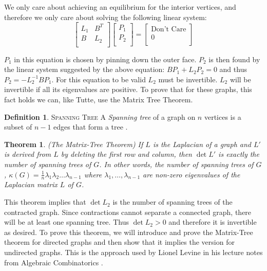 \documentclass[11pt]{article}
\newtheorem{theorem}{Theorem}[section]
\theoremstyle{definition}
\newtheorem{definition}{Definition}[section]
\begin{document}
	We only care about achieving an equilibrium for the interior vertices, and therefore we only care about solving the following linear system:
		\begin{equation}
			\begin{bmatrix}
				L_1 & B^T \\
				B & L_2 \\
			\end{bmatrix}
			\begin{bmatrix}
			 	P_1 \\
    				P_2 \\
			\end{bmatrix}
			=
			\begin{bmatrix}
				\text{Don't Care} \\
				0 \\
			\end{bmatrix}
		\end{equation}
	
	$P_1$ in this equation is chosen by pinning down the outer face.
	$P_2$ is then found by the linear system suggested by the above equation: $BP_1 + L_2P_2 = 0$ and thus $P_2 = -L_2^{-1}BP_1$. 
	For this equation to be valid $L_2$ must be invertible. 
	$L_2$ will be invertible if all its eigenvalues are positive.
	To prove that for these graphs, this fact holds we can, like Tutte, use the Matrix Tree Theorem.
	
	\theoremstyle{definition}
	\begin{definition}{\textsc{Spanning Tree}}
		A \emph{Spanning tree} of a graph on $n$ vertices is a subset of $n-1$ edges that form a tree \cite{mathworld:SpanningTree}.
	\end{definition}
	
	\begin{theorem}{(The Matrix-Tree Theorem)}
		If $L$ is the Laplacian of a graph and $L'$ is derived from $L$ by deleting the first row and column, then $\det L'$ is exactly the number of spanning trees of $G$.
		In other words, the number of spanning trees of $G$, $\kappa(G) = \frac{1}{n} \lambda_1\lambda_2 \dots \lambda_{n-1}$ where $\lambda_1, \dots, \lambda_{n-1}$ are non-zero eigenvalues of the Laplacian matrix $L$ of $G$.
	\end{theorem}
	
	This theorem implies that $\det L_2$ is the number of spanning trees of the contracted graph.
	Since contractions cannot separate a connected graph, there will be at least one spanning tree. 
	Thus $\det L_2 > 0$ and therefore it is invertible as desired.
	To prove this theorem, we will introduce and prove the Matrix-Tree theorem for directed graphs and then show that it implies the version for undirected graphs.
	This is the approach used by Lionel Levine in his lecture notes from Algebraic Combinatorics \cite{matrixTree}.
	
\end{document}
